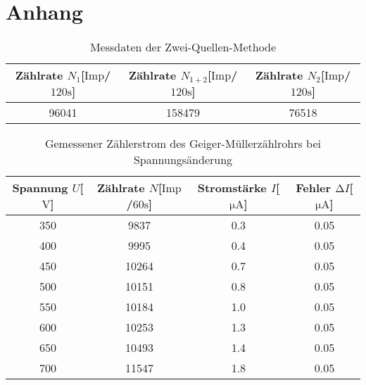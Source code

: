 \section{Anhang}

\begin{table}
\centering
\caption{Messdaten der Zwei-Quellen-Methode}
\label{tab:ogemessdaten3}
\begin{tabular}{c c c}
    \toprule
    Zählrate $N_{1}$[$\text{Imp}$/$120\si{\second}$] & Zählrate $N_{1+2}$[$\text{Imp}$/$120\si{\second}$] & Zählrate $N_{2}$[$\text{Imp}$/$120\si{\second}$]\\
    \midrule
    96041 & 158479 & 76518 \\
    \bottomrule
\end{tabular}
\end{table}

\begin{table}
\centering
\caption{Gemessener Zählerstrom des Geiger-Müllerzählrohrs bei Spannungsänderung}
\label{tab:ogemessdaten2}
\begin{tabular}{c c c c}
    \toprule
    Spannung $U$[$\si{\volt}$] & Zählrate $N$[$\text{Imp}$/$60\si{\second}$] & Stromstärke $I$[$\si{\micro\ampere}$] & Fehler $\increment I$[$\si{\micro\ampere}$]\\
    \midrule
    350  & 9837 & 0.3 & 0.05\\
    400	 & 9995 & 0.4 & 0.05\\
    450	 & 10264 & 0.7 & 0.05\\
    500	 & 10151 & 0.8 & 0.05\\
    550	 & 10184 & 1.0 & 0.05\\
    600	 & 10253 & 1.3 & 0.05\\
    650	 & 10493 & 1.4 & 0.05\\
    700	 & 11547 & 1.8 & 0.05\\
    \bottomrule
\end{tabular}
\end{table}

